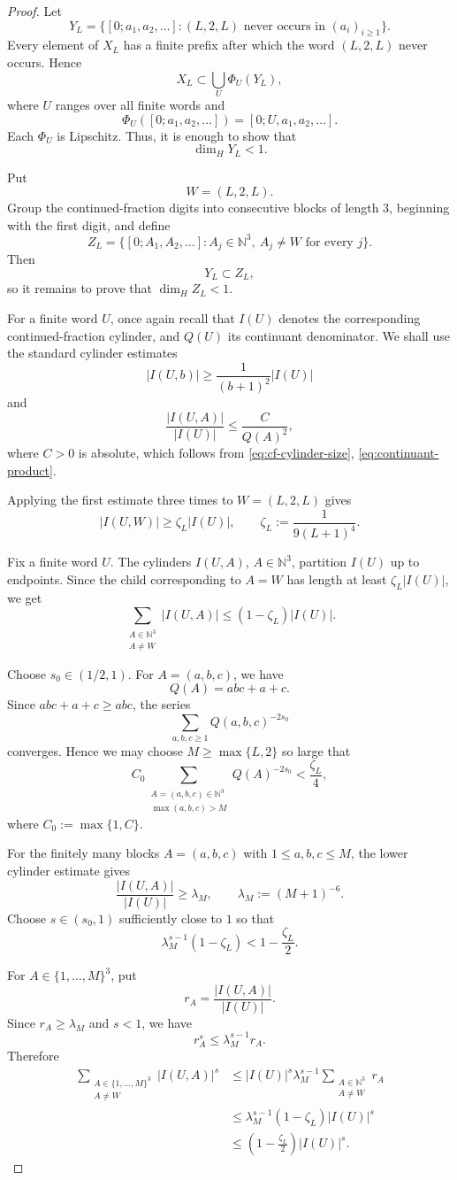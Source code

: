\documentclass[11pt]{amsart}
\begin{document}
\begin{proof}
Let
$$
Y_L=\{[0;a_1,a_2,\ldots]:(L,2,L)\text{ never occurs in }(a_i)_{i\ge1}\}.
$$
Every element of $X_L$ has a finite prefix after which the word $(L,2,L)$ never occurs. Hence
$$
X_L\subset \bigcup_U \Phi_U(Y_L),
$$
where $U$ ranges over all finite words and
$$
\Phi_U([0;a_1,a_2,\ldots])=[0;U,a_1,a_2,\ldots].
$$
Each $\Phi_U$ is Lipschitz. Thus, it is enough to show that
$$
\dim_H Y_L<1.
$$

Put
$$
W=(L,2,L).
$$
Group the continued-fraction digits into consecutive blocks of length $3$, beginning with the first digit, and define
$$
Z_L=
\{[0;A_1,A_2,\ldots]:A_j\in\mathbb N^3,\ A_j\ne W
\text{ for every }j\}.
$$
Then
$$
Y_L\subset Z_L,
$$
so it remains to prove that $\dim_H Z_L<1$.

For a finite word $U$, once again recall that $I(U)$ denotes the corresponding continued-fraction cylinder, and $Q(U)$ its continuant denominator. We shall use the standard cylinder estimates
$$
|I(U,b)|\ge \frac{1}{(b+1)^2}|I(U)|
$$
and
$$
\frac{|I(U,A)|}{|I(U)|}
\le
\frac{C}{Q(A)^2},
$$
where $C>0$ is absolute, which follows from \eqref{eq:cf-cylinder-size}, \eqref{eq:continuant-product}.

Applying the first estimate three times to $W=(L,2,L)$ gives
$$
|I(U,W)|\ge \zeta_L |I(U)|,
\qquad
\zeta_L:=\frac{1}{9(L+1)^4}.
$$

Fix a finite word $U$. The cylinders $I(U,A)$, $A\in\mathbb N^3$, partition $I(U)$ up to endpoints. Since the child corresponding to $A=W$ has length at least $\zeta_L|I(U)|$, we get
$$
\sum_{\substack{A\in\mathbb N^3\\ A\ne W}}
|I(U,A)|
\le
(1-\zeta_L)|I(U)|.
$$

Choose $s_0\in(1/2,1)$. For $A=(a,b,c)$, we have
$$
Q(A)=abc+a+c.
$$
Since $abc+a+c\ge abc$, the series
$$
\sum_{a,b,c\ge1} Q(a,b,c)^{-2s_0}
$$
converges. Hence we may choose $M\ge\max\{L,2\}$ so large that
$$
C_0
\sum_{\substack{A=(a,b,c)\in\mathbb N^3\\ \max(a,b,c)>M}}
Q(A)^{-2s_0}
<
\frac{\zeta_L}{4},
$$
where $C_0:=\max\{1,C\}$.

For the finitely many blocks $A=(a,b,c)$ with $1\le a,b,c\le M$, the lower cylinder estimate gives
$$
\frac{|I(U,A)|}{|I(U)|}
\ge
\lambda_M,
\qquad
\lambda_M:=(M+1)^{-6}.
$$
Choose $s\in(s_0,1)$ sufficiently close to $1$ so that
$$
\lambda_M^{s-1}(1-\zeta_L)
<
1-\frac{\zeta_L}{2}.
$$

For $A\in\{1,\ldots,M\}^3$, put
$$
r_A=\frac{|I(U,A)|}{|I(U)|}.
$$
Since $r_A\ge\lambda_M$ and $s<1$, we have
$$
r_A^s\le \lambda_M^{s-1}r_A.
$$
Therefore
\begin{align*}
\sum_{\substack{A\in\{1,\ldots,M\}^3\\ A\ne W}}
|I(U,A)|^s
&\le
|I(U)|^s\lambda_M^{s-1}
\sum_{\substack{A\in\mathbb N^3\\ A\ne W}} r_A \\
&\le
\lambda_M^{s-1}(1-\zeta_L)|I(U)|^s \\
&\le
\left(1-\frac{\zeta_L}{2}\right)|I(U)|^s.
\end{align*}



\end{proof}
\end{document}
